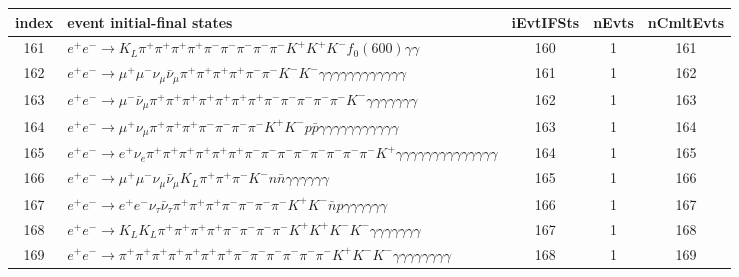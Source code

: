 \documentclass[landscape]{article}
\begin{document}
\clearpage

\begin{table}[htbp!]
\small
\centering
\begin{tabular}{|c|>{\centering}p{18cm}|c|c|c|}
\hline
index & event initial-final states & iEvtIFSts & nEvts & nCmltEvts \\
\hline
161 & $ e^{+} e^{-} \rightarrow K_{L} \pi^{+} \pi^{+} \pi^{+} \pi^{+} \pi^{-} \pi^{-} \pi^{-} \pi^{-} \pi^{-} K^{+} K^{+} K^{-} f_{0}(600) \gamma \gamma $ & 160 & 1 & 161 \\
\hline
162 & $ e^{+} e^{-} \rightarrow \mu^{+} \mu^{-} \nu_{\mu} \bar{\nu}_{\mu} \pi^{+} \pi^{+} \pi^{+} \pi^{+} \pi^{-} \pi^{-} K^{-} K^{-} \gamma \gamma \gamma \gamma \gamma \gamma \gamma \gamma \gamma \gamma \gamma \gamma $ & 161 & 1 & 162 \\
\hline
163 & $ e^{+} e^{-} \rightarrow \mu^{-} \bar{\nu}_{\mu} \pi^{+} \pi^{+} \pi^{+} \pi^{+} \pi^{+} \pi^{+} \pi^{+} \pi^{-} \pi^{-} \pi^{-} \pi^{-} \pi^{-} K^{-} \gamma \gamma \gamma \gamma \gamma \gamma \gamma $ & 162 & 1 & 163 \\
\hline
164 & $ e^{+} e^{-} \rightarrow \mu^{+} \nu_{\mu} \pi^{+} \pi^{+} \pi^{+} \pi^{-} \pi^{-} \pi^{-} \pi^{-} K^{+} K^{-} p \bar{p} \gamma \gamma \gamma \gamma \gamma \gamma \gamma \gamma \gamma \gamma \gamma $ & 163 & 1 & 164 \\
\hline
165 & $ e^{+} e^{-} \rightarrow e^{+} \nu_{e} \pi^{+} \pi^{+} \pi^{+} \pi^{+} \pi^{+} \pi^{+} \pi^{-} \pi^{-} \pi^{-} \pi^{-} \pi^{-} \pi^{-} \pi^{-} \pi^{-} K^{+} \gamma \gamma \gamma \gamma \gamma \gamma \gamma \gamma \gamma \gamma \gamma \gamma \gamma \gamma $ & 164 & 1 & 165 \\
\hline
166 & $ e^{+} e^{-} \rightarrow \mu^{+} \mu^{-} \nu_{\mu} \bar{\nu}_{\mu} K_{L} \pi^{+} \pi^{+} \pi^{-} K^{-} n \bar{n} \gamma \gamma \gamma \gamma \gamma \gamma $ & 165 & 1 & 166 \\
\hline
167 & $ e^{+} e^{-} \rightarrow e^{+} e^{-} \nu_{\tau} \bar{\nu}_{\tau} \pi^{+} \pi^{+} \pi^{+} \pi^{-} \pi^{-} \pi^{-} \pi^{-} K^{+} K^{-} \bar{n} p \gamma \gamma \gamma \gamma \gamma \gamma $ & 166 & 1 & 167 \\
\hline
168 & $ e^{+} e^{-} \rightarrow K_{L} K_{L} \pi^{+} \pi^{+} \pi^{+} \pi^{+} \pi^{-} \pi^{-} \pi^{-} \pi^{-} K^{+} K^{+} K^{-} K^{-} \gamma \gamma \gamma \gamma \gamma \gamma \gamma $ & 167 & 1 & 168 \\
\hline
169 & $ e^{+} e^{-} \rightarrow \pi^{+} \pi^{+} \pi^{+} \pi^{+} \pi^{+} \pi^{+} \pi^{+} \pi^{-} \pi^{-} \pi^{-} \pi^{-} \pi^{-} \pi^{-} K^{+} K^{-} K^{-} \gamma \gamma \gamma \gamma \gamma \gamma \gamma \gamma $ & 168 & 1 & 169 \\

\end{tabular}
\end{table}
\end{document}

